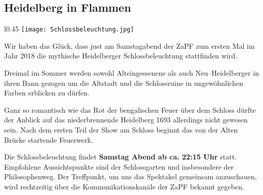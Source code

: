 \subsection*{Heidelberg in Flammen} %

\begin{wrapfigure}{l}{0.45\textwidth}
\texttt{[image: Schlossbeleuchtung.jpg]}
\vspace*{-20pt}
\end{wrapfigure}
Wir haben das Glück, dass just am Samstagabend der ZaPF zum ersten Mal im Jahr 2018 die mythische Heidelberger Schlossbeleuchtung stattfinden wird.

Dreimal im Sommer werden sowohl Alteingessenene als auch Neu--Heidelberger in ihren Bann gezogen um die Altstadt und die Schlossruine in ungewöhnlichen Farben erblicken zu dürfen.

Ganz so romantisch wie das Rot der bengalischen Feuer über dem Schloss dürfte der Anblick auf das niederbrennende Heidelberg 1693 allerdings nicht gewesen sein. Nach dem ersten Teil der Show am Schloss beginnt das von der Alten Brücke startende Feuerwerk. 

Die Schlossbeleuchtung findet \textbf{Samstag Abend ab ca. 22:15 Uhr} statt. Empfohlene Aussichtspunkte sind der Schlossgarten und insbesondere der Philosophenweg. Der Treffpunkt, um uns das Spektakel gemeinsam anzuschauen, wird rechtzeitig über die Kommunikationskanäle der ZaPF bekannt gegeben.
